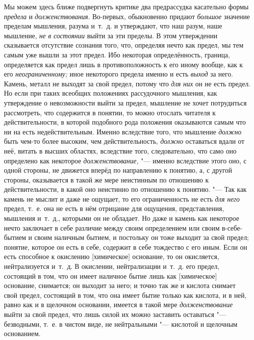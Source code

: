 Мы можем здесь ближе подвергнуть критике два предрассудка касательно формы
{\em предела} и {\em долженствования}. Во-первых, обыкновенно придают
{\em большое} значение пределам мышления, разума
и~т.~д. и утверждают, что наш разум, наше мышление,
{\em не в состоянии} выйти за эти пределы. В этом
утверждении сказывается отсутствие сознания того, что, определяя нечто как предел,
мы тем самым уже вышли за этот предел. Ибо некоторая определённость, граница,
определяется как предел лишь в противоположность к его иному вообще, как
к его {\em неограниченному;} иное некоторого предела
именно и есть {\em выход} за него. Камень, металл не
выходят за свой предел, потому что {\em для них} он не
есть предел. Но если при таких всеобщих положениях рассудочного мышления,
как утверждение о невозможности выйти за предел, мышление не хочет
потрудиться рассмотреть, что содержится в понятии, то можно отослать
читателя к действительности, в которой подобного рода положения оказываются
самым что ни на есть недействительным. Именно вследствие того, что мышление
{\em должно} быть чем-то более высоким, чем
действительность, {\em должно} оставаться вдали от неё,
витать в высших областях, вследствие того, следовательно, что само оно
определено как некоторое {\em долженствование,} "---
именно вследствие этого оно, с одной стороны, не движется вперёд по
направлению к понятию, а, с другой стороны, оказывается в такой же мере
неистинным по отношению к действительности, в какой оно неистинно по
отношению к понятию. "--- Так как камень не мыслит и даже не ощущает, то его
ограниченность не есть {\em для него} предел, т.~е. она
не есть в нём отрицание для ощущения, представления, мышления и~т.~д.,
которыми он не обладает. Но даже и камень как некоторое нечто заключает в
себе различие между своим определением или своим в-себе-бытием и своим
наличным бытием, и постольку он тоже выходит за свой предел; понятие,
которое он есть в себе, содержит в себе тождество с его иным. Если он
есть способное к окислению [химическое] основание, то он окисляется,
нейтрализуется и~т.~д. В окислении, нейтрализации и~т.~д. его предел,
состоящий в том, что он имеет наличное бытие лишь как [химическое]
основание, снимается; он выходит за него; и точно так же и кислота снимает
свой предел, состоящий в том, что она имеет бытие только как кислота, и в
ней, равно как и в щелочном основании, имеется в такой мере
{\em долженствование} выйти за свой предел, что лишь
силой их можно заставить оставаться "--- безводными, т.~е. в чистом виде, не
нейтральными "--- кислотой и щелочным основанием.

